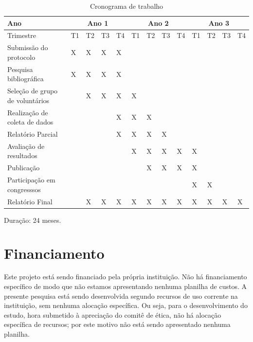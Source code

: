 \documentclass[rascunho,xindy]{Classe-Latex-FEI/fei}
\begin{document}
\begin{table}[ht]
  \caption{Cronograma de trabalho}
  \begin{center}
      \begin{tabular}{|l |l |l |l |l ||l |l |l |l ||l |l |l |l |}
      \hline
      Ano        & \multicolumn{4}{c||}{Ano 1} & \multicolumn{4}{c||}{Ano 2} & \multicolumn{4}{c|}{Ano 3} \\
      \hline
      Trimestre & T1 & T2 & T3 & T4 & T1 & T2 & T3 & T4 & T1 & T2 & T3 & T4 \\
      \hline
      Submissão do protocolo            & X & X & X & X &   &   &   &   &   &   &   &   \\
      Pesquisa bibliográfica            & X & X & X & X &   &   &   &   &   &   &   &   \\
      Seleção de grupo de voluntários   &   & X & X & X & X &   &   &   &   &   &   &   \\
      Realização de coleta de dados     &   &   &   & X & X & X &   &   &   &   &   &   \\
      Relatório Parcial                 &   &   &   & X & X & X & X &   &   &   &   &   \\
      Avaliação de resultados           &   &   &   &   & X & X & X & X & X &   &   &   \\ 
      Publicação                        &   &   &   &   &   & X & X & X & X &   &   &   \\
      Participação em congresssos       &   &   &   &   &   &   &   &   & X & X &   &   \\
      \hline
      Relatório Final                   &   & X & X & X & X & X & X & X & X & X & X & X \\
      \hline
      \end{tabular}
  \end{center}
  \label{table:cronograma}
\end{table} 

Duração: 24 meses.

\chapter{Financiamento}

Este projeto está sendo financiado pela própria instituição. Não há financiamento específico de modo que não estamos apresentando nenhuma planilha de custos. A presente pesquisa está sendo desenvolvida segundo recursos de uso corrente na instituição, sem nenhuma alocação específica. Ou seja, para o desenvolvimento do estudo, hora submetido à apreciação do comitê de ética, não há alocação específica de recursos; por este motivo não está sendo apresentado nenhuma planilha.
\end{document}
